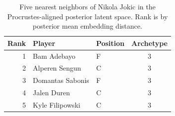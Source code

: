 \begin{table}[htbp]
  \centering\small
  \begin{tabular}{rllc}
    \toprule
    Rank & Player & Position & Archetype \\
    \midrule
    1 & Bam Adebayo & F & 3 \\
    2 & Alperen Sengun & C & 3 \\
    3 & Domantas Sabonis & F & 3 \\
    4 & Jalen Duren & C & 3 \\
    5 & Kyle Filipowski & C & 3 \\
    \bottomrule
  \end{tabular}
  \caption{Five nearest neighbors of Nikola Jokic in the Procrustes-aligned posterior latent space. Rank is by posterior mean embedding distance.}
  \label{tab:Nikola_Jokic_neighbors}
\end{table}

